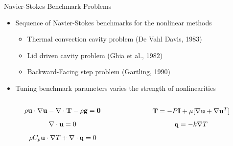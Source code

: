 \documentclass{beamer}
\begin{document}
\begin{frame}{Navier-Stokes Benchmark Problems}

  \begin{itemize}
  \item Sequence of Navier-Stokes benchmarks for the nonlinear methods
    \begin{itemize}
    \item Thermal convection cavity problem (De Vahl Davis, 1983)
    \item Lid driven cavity problem (Ghia et al., 1982)
    \item Backward-Facing step problem (Gartling, 1990)
    \end{itemize}
    \medskip
  \item Tuning benchmark parameters varies the strength of
    nonlinearities
    \medskip
  \end{itemize}

  \medskip  \medskip
  \begin{columns}
    \begin{column}{0.5\textwidth}
      \[
      \rho \mathbf{u} \cdot \nabla \mathbf{u} - \nabla \cdot \mathbf{T} - \rho
      \mathbf{g} = \mathbf{0}
      \]
      \[
      \nabla \cdot \mathbf{u} = 0
      \]
      \[
      \rho C_p \mathbf{u} \cdot \nabla T + \nabla \cdot \mathbf{q} = 0
      \]
    \end{column}

    \begin{column}{0.5\textwidth}
      \[
      \mathbf{T} = -P \mathbf{I} + \mu[\nabla \mathbf{u} + \nabla \mathbf{u}^T]
      \]
      \[
      \mathbf{q} = - k \nabla T
      \]
    \end{column}
  \end{columns}

\end{frame}
\end{document}

